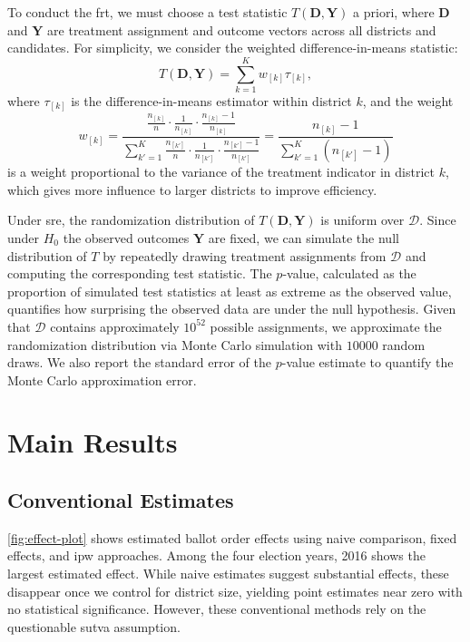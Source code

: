 \documentclass[10pt]{article}
\theoremstyle{sfstyle}
\theoremstyle{remark}
\begin{document}
To conduct the \gls{frt},
we must choose a test statistic
$T(\mathbf{D}, \mathbf{Y})$ a priori,
where $\mathbf{D}$ and $\mathbf{Y}$
are treatment assignment and outcome vectors
across all districts and candidates.
For simplicity,
we consider the weighted difference-in-means statistic:
\[
  T(\mathbf{D}, \mathbf{Y}) =
  \sum_{k=1}^K w_{[k]} \tau_{[k]},
\]
where $\tau_{[k]}$ is the difference-in-means estimator
within district $k$,
and the weight
\[
  w_{[k]} 
  = \frac{\frac{n_{[k]}}{n} \cdot \frac{1}{n_{[k]}} \cdot \frac{n_{[k]} - 1}{n_{[k]}}}{\sum_{k'=1}^K \frac{n_{[k']}}{n} \cdot \frac{1}{n_{[k']}} \cdot \frac{n_{[k']} - 1}{n_{[k']}}}
  = \frac{n_{[k]} - 1}{\sum_{k'=1}^K (n_{[k']} - 1)}
\]
is a weight proportional to the variance of the treatment indicator
in district $k$,
which gives more influence to larger districts
to improve efficiency.

Under \gls{sre},
the randomization distribution of $T(\mathbf{D}, \mathbf{Y})$
is uniform over $\mathcal{D}$.
Since under $H_0$ the observed outcomes $\mathbf{Y}$ are fixed,
we can simulate the null distribution of $T$
by repeatedly drawing treatment assignments from $\mathcal{D}$
and computing the corresponding test statistic.
The $p$-value,
calculated as the proportion of simulated test statistics
at least as extreme as the observed value,
quantifies how surprising the observed data are under the null hypothesis.
Given that $\mathcal{D}$ contains approximately $10^{52}$ possible assignments,
we approximate the randomization distribution via Monte Carlo simulation
with $10000$ random draws.
We also report the standard error of the $p$-value estimate
to quantify the Monte Carlo approximation error.

\section{Main Results} \label{sec:main-results}

\subsection{Conventional Estimates}

\cref{fig:effect-plot} shows 
estimated ballot order effects using 
naive comparison, fixed effects, 
and \gls{ipw} approaches. 
Among the four election years,
2016 shows the largest estimated effect.
While naive estimates suggest substantial effects,
these disappear once we control for district size, 
yielding point estimates near zero with 
no statistical significance. 
However, these conventional methods 
rely on the questionable \gls{sutva} assumption.
\end{document}
